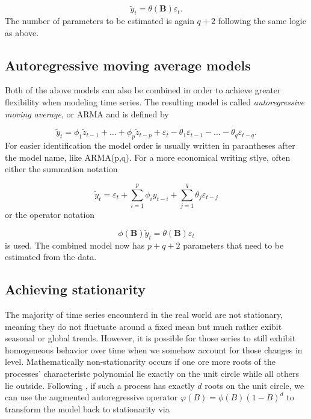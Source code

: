 \begin{equation}
        \tilde{y}_t = \theta (\boldsymbol{B})\varepsilon_t.
\end{equation}
%
The number of parameters to be estimated is again $q+2$ following the same logic as above.

\subsection{Autoregressive moving average models}

Both of the above models can also be combined in order to achieve greater flexibility when modeling time series. The resulting model is called \textit{autoregressive moving average}, or ARMA and is defined by 

\begin{equation}
        \tilde{y}_{t}=\phi_{1} \tilde{z}_{t-1}+\dots+\phi_{p} \tilde{z}_{t-p}+\varepsilon_{t}-\theta_{1} \varepsilon_{t-1}-\dots-\theta_{q} \varepsilon_{t-q}.
\end{equation}
%
For easier identification the model order is usually written in parantheses after the model name, like ARMA(p,q). For a more economical writing stlye, often either the summation notation

\begin{equation}
        \tilde{y}_{t}=\varepsilon_{t}+\sum_{i=1}^{p} \phi_{i} y_{t-i}+\sum_{j=1}^{q} \theta_{j} \varepsilon_{t-j}
\end{equation}
%
or the operator notation

\begin{equation}
        \phi(\boldsymbol{B}) \tilde{y}_{t}=\theta(\boldsymbol{B}) \varepsilon_{t}
\end{equation}
%
is used. The combined model now has $p+q+2$ parameters that need to be estimated from the data. 

\subsection{Achieving stationarity}

The majority of time series encounterd in the real world are not stationary, meaning they do not fluctuate around a fixed mean but much rather exibit seasonal or global trends. However, it is possible for those series to still exhibit homogeneous behavior over time when we somehow account for those changes in level. Mathematically non-stationarity occurs if one ore more roots of the processes' characteristc polynomial lie exactly on the unit circle while all others lie outside. Following \citet{box1976time}, if such a process has exactly $d$ roots on the unit circle, we can use the augmented autoregressive operator $\varphi(B)=\phi(B)(1-B)^{d}$ to transform the model back to stationarity via

